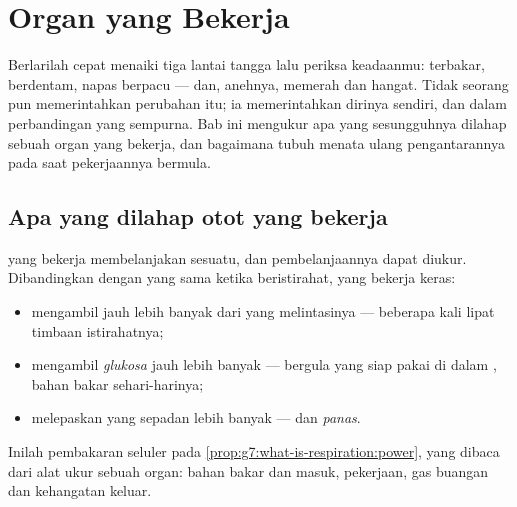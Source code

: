 \chapter{Organ yang Bekerja}\label{ch:g7:organs-at-work}

Berlarilah cepat menaiki tiga lantai tangga lalu periksa keadaanmu:
 terbakar,  berdentam, napas berpacu --- dan, anehnya,
 memerah dan hangat. Tidak seorang pun memerintahkan perubahan
itu; ia memerintahkan dirinya sendiri, dan dalam perbandingan yang
sempurna. Bab ini mengukur apa yang sesungguhnya dilahap sebuah organ
yang bekerja, dan bagaimana tubuh menata ulang pengantarannya pada
saat pekerjaannya bermula.

\section{Apa yang dilahap otot yang bekerja}

\begin{proposition}\label{prop:g7:organs-at-work:bill}
 yang bekerja membelanjakan sesuatu, dan pembelanjaannya dapat
diukur. Dibandingkan dengan  yang sama ketika beristirahat, 
yang bekerja keras:
\begin{itemize}
  \item mengambil \emph{} jauh lebih banyak dari  yang
        melintasinya --- beberapa kali lipat timbaan istirahatnya;
  \item mengambil \emph{glukosa} jauh lebih banyak ---
         bergula yang siap pakai di dalam , bahan bakar
        sehari-harinya;
  \item melepaskan \emph{} yang sepadan lebih banyak
        --- dan \emph{panas}.
\end{itemize}
Inilah pembakaran seluler pada
\cref{prop:g7:what-is-respiration:power}, yang dibaca dari alat ukur
sebuah organ: bahan bakar dan  masuk, pekerjaan, gas buangan
dan kehangatan keluar.
\end{proposition}
\admitted

